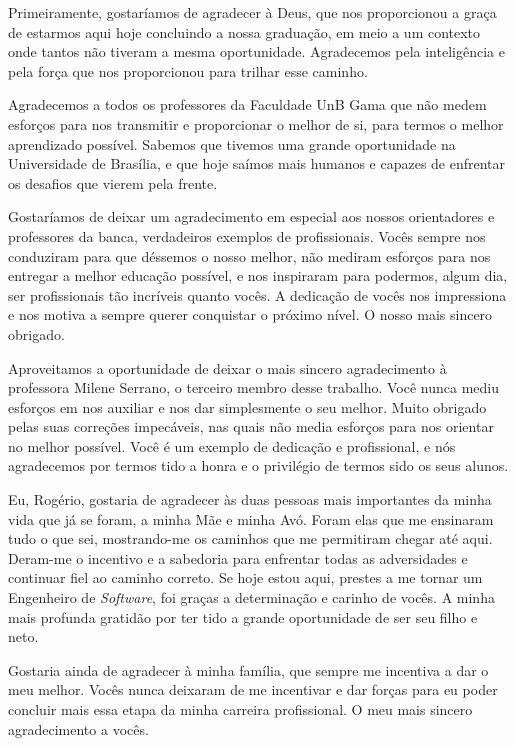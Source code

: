 \begin{agradecimentos}

Primeiramente, gostaríamos de agradecer à Deus, que nos proporcionou a graça de estarmos aqui hoje concluindo a nossa graduação, em meio a um contexto onde tantos não tiveram a mesma oportunidade. Agradecemos pela inteligência e pela força que nos proporcionou para trilhar esse caminho.

Agradecemos a todos os professores da Faculdade UnB Gama que não medem esforços para nos transmitir e proporcionar o melhor de si, para termos o melhor aprendizado possível. Sabemos que tivemos uma grande oportunidade na Universidade de Brasília, e que hoje saímos mais humanos e capazes de enfrentar os desafios que vierem pela frente.

Gostaríamos de deixar um agradecimento em especial aos nossos orientadores e professores da banca, verdadeiros exemplos de profissionais. Vocês sempre nos conduziram para que déssemos o nosso melhor, não mediram esforços para nos entregar a melhor educação possível, e nos inspiraram para podermos, algum dia, ser profissionais tão incríveis quanto vocês. A dedicação de vocês nos impressiona e nos motiva a sempre querer conquistar o próximo nível. O nosso mais sincero obrigado.

Aproveitamos a oportunidade de deixar o mais sincero agradecimento à professora Milene Serrano, o terceiro membro desse trabalho. Você nunca mediu esforços em nos auxiliar e nos dar simplesmente o seu melhor. Muito obrigado pelas suas correções impecáveis, nas quais não media esforços para nos orientar no melhor possível. Você é um exemplo de dedicação e profissional, e nós agradecemos por termos tido a honra e o privilégio de termos sido os seus alunos.

Eu, Rogério, gostaria de agradecer às duas pessoas mais importantes da minha vida que já se foram, a minha Mãe e minha Avó. Foram elas que me ensinaram tudo o que sei, mostrando-me os caminhos que me permitiram chegar até aqui. Deram-me o incentivo e a sabedoria para enfrentar todas as adversidades e continuar fiel ao caminho correto. Se hoje estou aqui, prestes a me tornar um Engenheiro de \textit{Software}, foi graças a determinação e carinho de vocês. A minha mais profunda gratidão por ter tido a grande oportunidade de ser seu filho e neto.

Gostaria ainda de agradecer à minha família, que sempre me incentiva a dar o meu melhor. Vocês nunca deixaram de me incentivar e dar forças para eu poder concluir mais essa etapa da minha carreira profissional. O meu mais sincero agradecimento a vocês.


\end{agradecimentos}
